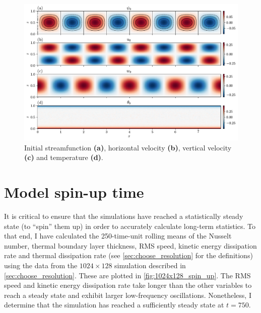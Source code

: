 \documentclass[../main.tex]{subfiles}
\begin{document}
\begin{figure}[ht]
    \centering
    \includegraphics[width=\linewidth]{figures/init.pdf}
    \caption{
        Initial streamfunction \textbf{(a)}, horizontal velocity \textbf{(b)},
        vertical velocity \textbf{(c)} and temperature \textbf{(d)}.
    }
    \label{fig:init}
\end{figure}


\section{Model spin-up time} \label{sec:spinup}
It is critical to ensure that the simulations have reached a statistically
steady state (to ``spin'' them up) in order to accurately calculate long-term
statistics. To that end, I have calculated the 250-time-unit rolling means of
the Nusselt number, thermal boundary layer thickness, RMS speed, kinetic energy
dissipation rate and thermal dissipation rate (see
\cref{sec:choose_resolution} for the definitions) using the data from the
$1024 \times 128$ simulation described in \cref{sec:choose_resolution}.
These are plotted in \cref{fig:1024x128_spin_up}. The RMS speed and kinetic
energy dissipation rate take longer than the other variables to reach a steady
state and exhibit larger low-frequency oscillations. Nonetheless, I determine
that the simulation has reached a sufficiently steady state at $t = 750$.
\end{document}

